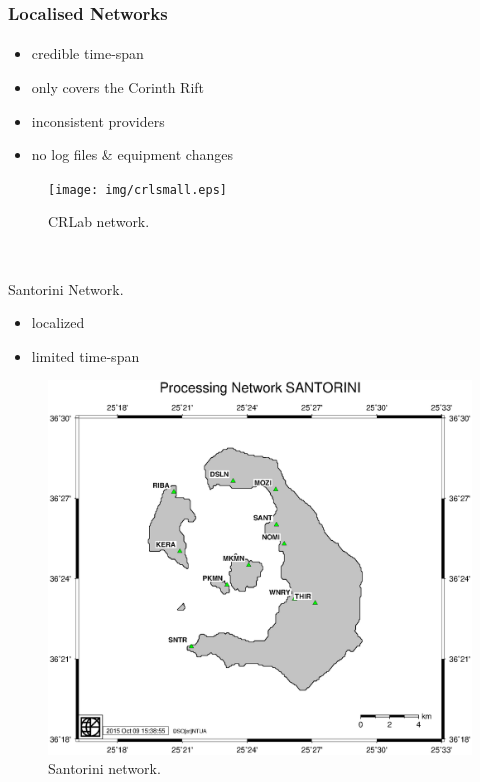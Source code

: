 \documentclass{beamer}
\newcommand\FourQuad[4]{
    \begin{minipage}[b][.45\textheight][t]{.50\textwidth}\centering#1\end{minipage}\hfill%
    \begin{minipage}[b][.45\textheight][t]{.50\textwidth}\centering#2\end{minipage}\\[0.9em]
    \begin{minipage}[b][.45\textheight][t]{.50\textwidth}\centering#3\end{minipage}\hfill
    \begin{minipage}[b][.45\textheight][t]{.50\textwidth}\centering#4\end{minipage}%
}
\begin{document}
\begin{frame}\frametitle{Localised Networks}\framesubtitle{}
  \FourQuad
  {
  \begin{itemize}
    \item<pro@1-> credible time-span
    \item<pro@1-> only covers the Corinth Rift
    \item<con@1-> inconsistent providers
    \item<con@1-> no log files \& equipment changes
  \end{itemize}
  }
  {
 \begin{figure}
 \begin{center}
 \texttt{[image: img/crlsmall.eps]}
 \caption{CRLab network.}
 \label{fig:crlab}
 \end{center}
 \end{figure}
  }
  {
  Santorini Network. 
  \begin{itemize}
    \item<con@1-> localized
    \item<con@1-> limited time-span
  \end{itemize}
  }
  {
 \begin{figure}
 \begin{center}
 \includegraphics[trim={1cm 2cm 1cm 2.8cm},clip,width=.7\textwidth]{img/sntrnet.eps}
 \caption{Santorini network.}
 \label{fig:sntrnet}
 \end{center}
 \end{figure}
  }
\end{frame}
\end{document}
